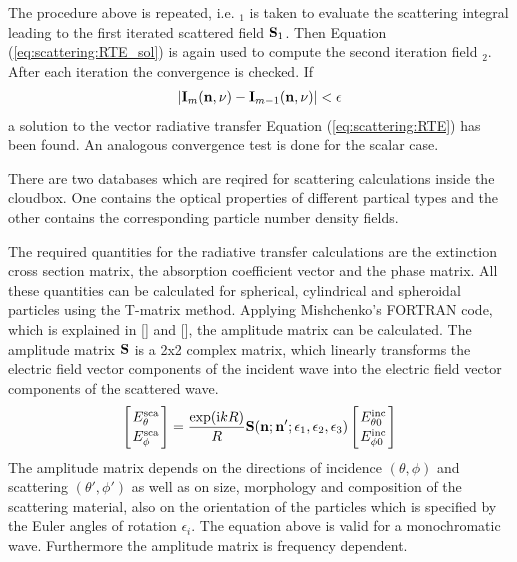 The procedure above is repeated, i.e. \StoVec$_1$ is taken to evaluate
the scattering integral leading to the first iterated scattered field
${\bf S}_1$. Then Equation (\ref{eq:scattering:RTE_sol}) is again used to
compute the
second iteration field \StoVec$_2$. \\
After each iteration the convergence is checked. If 
\begin{eqnarray}
|{\bf I}_m ({\bf n}, \nu) -  {\bf I}_{m-1} ({\bf n}, \nu)| < {\bf \epsilon}
\end{eqnarray}
a solution to the vector radiative transfer Equation (\ref{eq:scattering:RTE})
has been
found. An analogous convergence test is done for the scalar case.

\label{sec:scattering:database}

There are two databases which are reqired for scattering calculations
inside the cloudbox. One contains the optical properties of different
partical types and the other contains the corresponding particle
number density fields.

\label{sec:scattering:amp_mat_data}

The required quantities for the radiative transfer calculations are
the  extinction cross section matrix, the
absorption coefficient vector and the phase
matrix. All these quantities can be calculated for spherical,
cylindrical and spheroidal particles using the T-matrix
method. Applying Mishchenko's FORTRAN code, which is explained in
[\cite{Mishchenko:98}] and [\cite{Mishchenko:00}],   
the amplitude matrix can be calculated. The
amplitude matrix ${\bf S}$ is a 2x2 complex matrix, which linearly transforms 
the electric field vector components of the incident wave into the
electric field vector components of the scattered wave.  
\begin{eqnarray}
  \label{eq:ampl_matrix}
  \left[{E^{\rm sca}_{\theta}\atop E^{\rm sca}_{\phi}}\right] =
  \frac{\exp({\rm i} kR)}{R}{\bf S}({\bf n};{\bf
      n'};\epsilon_1,\epsilon_2,\epsilon_3)\left[{E^{\rm inc}_{\theta
          0}\atop E^{\rm inc}_{\phi 0}}\right] 
\end{eqnarray}
The amplitude matrix depends on the directions of incidence  $(\theta,
\phi)$  and
scattering $(\theta', \phi')$ as  well as on size, morphology and composition of the
scattering material, also on the orientation of the particles which
is specified by the Euler angles of rotation $\epsilon _i$. 
The equation above is valid for a monochromatic wave.  Furthermore the
amplitude matrix is frequency dependent.


